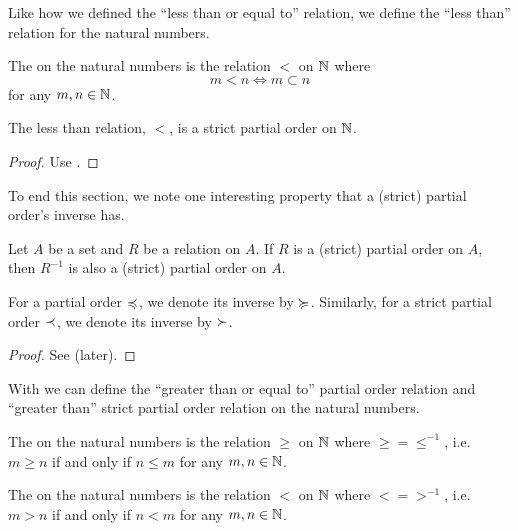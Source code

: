Like how we defined the ``less than or equal to'' relation, we define the ``less than'' relation for the natural numbers.

\begin{definition}
    The  on the natural numbers is the relation $<$ on $\mathbb{N}$ where
    \[
        m < n \iff m \subset n
    \]
    for any $m, n \in \mathbb{N}$.
\end{definition}

\begin{proposition}
    The less than relation, $<$, is a strict partial order on $\mathbb{N}$.
\end{proposition}
\begin{proof}
    Use .
\end{proof}

To end this section, we note one interesting property that a (strict) partial order's inverse has.

\begin{proposition}\label{prop:por-inverse-is-also-por}
    Let $A$ be a set and $R$ be a relation on $A$. If $R$ is a (strict) partial order on $A$, then $R^{-1}$ is also a (strict) partial order on $A$.
\end{proposition}
\begin{remark}
    For a partial order $\preccurlyeq$, we denote its inverse by $\succcurlyeq$. Similarly, for a strict partial order $\prec$, we denote its inverse by $\succ$.
\end{remark}
\begin{proof}
    See  (later).
\end{proof}

With  we can define the ``greater than or equal to'' partial order relation and ``greater than'' strict partial order relation on the natural numbers.

\begin{definition}
    The  on the natural numbers is the relation $\geq$ on $\mathbb{N}$ where $\geq = \leq^{-1}$, i.e. $m \geq n$ if and only if $n \leq m$ for any $m, n \in \mathbb{N}$.
\end{definition}

\begin{definition}
    The  on the natural numbers is the relation $<$ on $\mathbb{N}$ where $< = >^{-1}$, i.e. $m > n$ if and only if $n < m$ for any $m, n \in \mathbb{N}$.
\end{definition}

